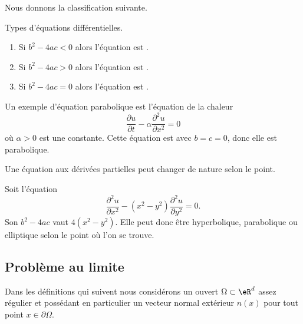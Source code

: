 Nous donnons la classification suivante.

\begin{definition}
	Types d'équations différentielles.
	\begin{enumerate}
		\item
		      Si \( b^2-4ac<0\) alors l'équation est .
		\item
		      Si \( b^2-4ac>0\) alors l'équation est .
		\item
		      Si \( b^2-4ac=0\) alors l'équation est .
	\end{enumerate}

\end{definition}

\begin{example}
	Un exemple d'équation parabolique est l'équation de la chaleur
	\begin{equation}
		\frac{ \partial u }{ \partial t }-\alpha\frac{ \partial^2u }{ \partial x^2 }=0
	\end{equation}
	où \( \alpha>0\) est une constante. Cette équation est avec \( b=c=0\), donc elle est parabolique.
\end{example}

Une équation aux dérivées partielles peut changer de nature selon le point.

\begin{example}
	Soit l'équation
	\begin{equation}
		\frac{ \partial^2u }{ \partial x^2 }-(x^2-y^2)\frac{ \partial^2u }{ \partial y^2 }=0.
	\end{equation}
	Son \( b^2-4ac\) vaut \( 4(x^2-y^2)\). Elle peut donc être hyperbolique, parabolique ou elliptique selon le point où l'on se trouve.
\end{example}

\subsection{Problème au limite}

Dans les définitions qui suivent nous considérons un ouvert \( \Omega\subset \eR^d\) assez régulier et possédant en particulier un vecteur normal extérieur \( n(x)\) pour tout point \( x\in\partial\Omega\).

